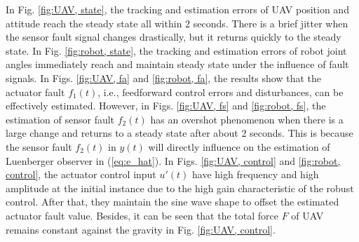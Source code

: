 \documentclass{ieeeaccess}
\begin{document}
In Fig. \ref{fig:UAV, state}, the tracking and estimation errors of UAV position and attitude reach the steady state all within $2$ seconds. There is a brief jitter when the sensor fault signal changes drastically, but it returns quickly to the steady state. In Fig. \ref{fig:robot, state}, the tracking and estimation errors of robot joint angles immediately reach and maintain steady state under the influence of fault signals. In Figs. \ref{fig:UAV, fa} and \ref{fig:robot, fa}, the results show that the actuator fault $f_1(t)$, i.e., feedforward control errors and disturbances, can be effectively estimated. However, in Figs. \ref{fig:UAV, fs} and \ref{fig:robot, fs}, the estimation of sensor fault $f_2(t)$ has an overshot phenomenon when there is a large change and returns to a steady state after about $2$ seconds. This is because the sensor fault $f_2(t)$ in $y(t)$ will directly influence on the estimation of Luenberger observer in (\ref{eq:e_hat}). In Figs. \ref{fig:UAV, control} and \ref{fig:robot, control}, the actuator control input $u'(t)$ have high frequency and high amplitude at the initial instance due to the high gain characteristic of the robust control. After that, they maintain the sine wave shape to offset the estimated actuator fault value. Besides, it can be seen that the total force $F$ of UAV remains constant against the gravity in Fig. \ref{fig:UAV, control}.
\end{document}
